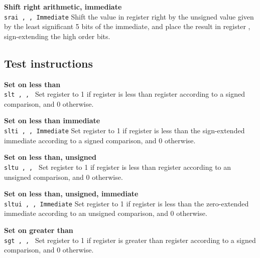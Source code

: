 \noindent
{\bf Shift right arithmetic, immediate}\\
\noindent
\texttt{srai \regd, \regs, Immediate}
Shift the value in register \regs{} right by the unsigned value given by the
least significant 5 bits of the immediate, and place the result in register \regd{},
sign-extending the high order bits.
\vspace{3ex}

\subsection{Test instructions}

\noindent
{\bf Set on less than}\\
\noindent
\texttt{slt \regd, \regs, \regt}
Set register \regd{} to 1 if register \regs{} is
less than register \regt{} according to a signed comparison, and 0 otherwise.
\vspace{3ex}

\noindent
{\bf Set on less than immediate}\\
\noindent
\texttt{slti \regd, \regs, Immediate}
Set register \regd{} to 1 if register \regs{} is
less than the sign-extended immediate according to a signed comparison, and 0 otherwise.
\vspace{3ex}

\noindent
{\bf Set on less than, unsigned}\\
\noindent
\texttt{sltu \regd, \regs, \regt}
Set register \regd{} to 1 if register \regs{} is
less than register \regt{} according to an unsigned comparison, and 0 otherwise.
\vspace{3ex}

\noindent
{\bf Set on less than, unsigned, immediate}\\
\noindent
\texttt{sltui \regd, \regs, Immediate}
Set register \regd{} to 1 if register \regs{} is
less than the zero-extended immediate according to an unsigned comparison, and 0 otherwise.
\vspace{3ex}
\newpage

\noindent
{\bf Set on greater than}\\
\noindent
\texttt{sgt \regd, \regs, \regt}
Set register \regd{} to 1 if register \regs{} is
greater than register \regt{} according to a signed comparison, and 0 otherwise.
\vspace{3ex}


